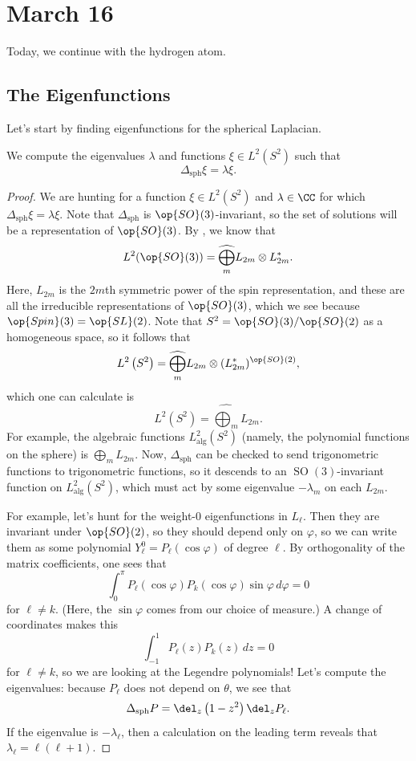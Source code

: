 \documentclass[../notes.tex]{subfiles}
\begin{document}
\section{March 16}
Today, we continue with the hydrogen atom.

\subsection{The Eigenfunctions}
Let's start by finding eigenfunctions for the spherical Laplacian.
\begin{lemma}
	We compute the eigenvalues $\lambda$ and functions $\xi\in L^2\left(S^2\right)$ such that
	\[\Delta_{\mathrm{sph}}\xi=\lambda\xi.\]
\end{lemma}
\begin{proof}
	We are hunting for a function $\xi\in L^2\left(S^2\right)$ and $\lambda\in\CC$ for which $\Delta_{\mathrm{sph}}\xi=\lambda\xi$. Note that $\Delta_{\mathrm{sph}}$ is $\op{SO}(3)$-invariant, so the set of solutions will be a representation of $\op{SO}(3)$. By , we know that
	\[L^2(\op{SO}(3))=\widehat{\bigoplus_m}L_{2m}\otimes L_{2m}^*.\]
	Here, $L_{2m}$ is the $2m$th symmetric power of the spin representation, and these are all the irreducible representations of $\op{SO}(3)$, which we see because $\op{Spin}(3)=\op{SL}(2)$. Note that $S^2=\op{SO}(3)/\op{SO}(2)$ as a homogeneous space, so it follows that
	\[L^2\left(S^2\right)=\widehat{\bigoplus_m}L_{2m}\otimes (L_{2m}^*)^{\op{SO}(2)},\]
	which one can calculate is
	\[L^2\left(S^2\right)=\widehat{\bigoplus_m}L_{2m}.\]
	For example, the algebraic functions $L^2_{\mathrm{alg}}\left(S^2\right)$ (namely, the polynomial functions on the sphere) is $\bigoplus_mL_{2m}$. Now, $\Delta_{\mathrm{sph}}$ can be checked to send trigonometric functions to trigonometric functions, so it descends to an $\operatorname{SO}(3)$-invariant function on $L^2_{\mathrm{alg}}\left(S^2\right)$, which must act by some eigenvalue $-\lambda_m$ on each $L_{2m}$.

	For example, let's hunt for the weight-$0$ eigenfunctions in $L_\ell$. Then they are invariant under $\op{SO}(2)$, so they should depend only on $\varphi$, so we can write them as some polynomial $Y^0_\ell=P_\ell(\cos\varphi)$ of degree $\ell$. By orthogonality of the matrix coefficients, one sees that
	\[\int_0^\pi P_\ell(\cos\varphi)P_k(\cos\varphi)\sin\varphi\,d\varphi=0\]
	for $\ell\ne k$. (Here, the $\sin\varphi$ comes from our choice of measure.) A change of coordinates makes this
	\[\int_{-1}^1P_\ell(z)P_k(z)\,dz=0\]
	for $\ell\ne k$, so we are looking at the Legendre polynomials! Let's compute the eigenvalues: because $P_\ell$ does not depend on $\theta$, we see that
	\[\Delta_{\mathrm{sph}}P=\del_z\left(1-z^2\right)\del_zP_\ell.\]
	If the eigenvalue is $-\lambda_\ell$, then a calculation on the leading term reveals that $\lambda_\ell=\ell(\ell+1)$.


\end{proof}
\end{document}
